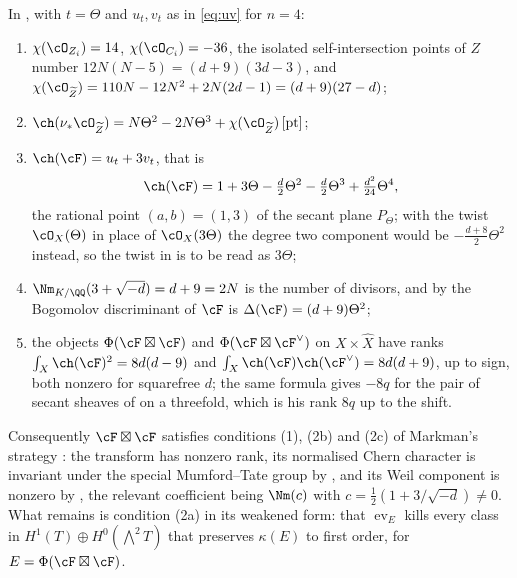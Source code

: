 \begin{proposition}
\label{prop:markman8}
In , with $t=\Theta$ and $u_{t},v_{t}$ as in
\eqref{eq:uv} for $n=4$:
\begin{enumerate}[label=\textup{(\roman*)},nosep]
\item $\chi(\cO_{Z_{i}})=14$, $\chi(\cO_{C_{i}})=-36$, the isolated
  self-intersection points of $Z$ number $12N(N-5)=(d+9)(3d-3)$, and
  $\chi(\cO_{\widetilde Z})=110N-12N^{2}+2N(2d-1)=(d+9)(27-d)$;
\item $\ch(\nu_{*}\cO_{\widetilde Z})=N\Theta^{2}-2N\Theta^{3}
  +\chi(\cO_{\widetilde Z})\,[\mathrm{pt}]$;
\item $\ch(\cF)=u_{t}+3v_{t}$, that is
  \[
    \ch(\cF)=1+3\Theta-\tfrac{d}{2}\Theta^{2}-\tfrac{d}{2}\Theta^{3}
      +\tfrac{d^{2}}{24}\Theta^{4},
  \]
  the rational point $(a,b)=(1,3)$ of the secant plane $P_{\Theta}$; with
  the twist $\cO_{X}(\Theta)$ in place of $\cO_{X}(3\Theta)$ the degree two
  component would be $-\tfrac{d+8}{2}\Theta^{2}$ instead, so the twist in
  \cite[Section 12]{Mar25b} is to be read as $3\Theta$;
\item $\Nm_{K/\QQ}(3+\sqrt{-d})=d+9=2N$ is the number of divisors, and by
   the Bogomolov discriminant of $\cF$ is
  $\Delta(\cF)=(d+9)\Theta^{2}$;
\item the objects $\Phi(\cF\boxtimes\cF)$ and $\Phi(\cF\boxtimes\cF^{\vee})$
  on $X\times\widehat X$ have ranks
  $\int_{X}\ch(\cF)^{2}=8d(d-9)$ and
  $\int_{X}\ch(\cF)\ch(\cF^{\vee})=8d(d+9)$, up to sign, both nonzero for
  squarefree $d$; the same formula gives $-8q$ for the pair of secant sheaves
  of \cite[Section 11]{Mar25b} on a threefold, which is his rank $8q$ up to
  the shift.
\end{enumerate}
Consequently $\cF\boxtimes\cF$ satisfies conditions (1), (2b) and (2c) of
Markman's strategy \cite[Section 4]{Mar25b}: the transform has nonzero rank,
its normalised Chern character is invariant under the special Mumford--Tate
group by \cite[Corollary 9.2]{Mar25b}, and its Weil component is nonzero by
\cite[Proposition 10.2]{Mar25b}, the relevant coefficient being
$\Nm(c)$ with $c=\tfrac12(1+3/\sqrt{-d})\ne0$. What remains is condition
(2a) in its weakened form: that $\operatorname{ev}_{E}$ kills every class in
$H^{1}(T)\oplus H^{0}(\bigwedge^{2}T)$ that preserves $\kappa(E)$ to first
order, for $E=\Phi(\cF\boxtimes\cF)$.
\end{proposition}

